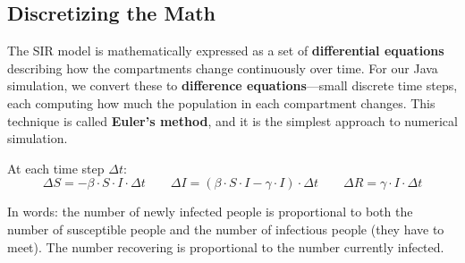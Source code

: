 \documentclass[11pt,letterpaper]{article}
\newcommand{\keyterm}[1]{\textbf{\textcolor{cssecondary}{#1}}}
\begin{document}
\begin{center}
\end{center}

\subsection{Discretizing the Math}

The SIR model is mathematically expressed as a set of \keyterm{differential equations} describing how the compartments change continuously over time. For our Java simulation, we convert these to \keyterm{difference equations}---small discrete time steps, each computing how much the population in each compartment changes. This technique is called \keyterm{Euler's method}, and it is the simplest approach to numerical simulation.

At each time step $\Delta t$:
\[
\Delta S = -\beta \cdot S \cdot I \cdot \Delta t
\qquad
\Delta I = \left(\beta \cdot S \cdot I - \gamma \cdot I\right) \cdot \Delta t
\qquad
\Delta R = \gamma \cdot I \cdot \Delta t
\]

In words: the number of newly infected people is proportional to both the number of susceptible people and the number of infectious people (they have to meet). The number recovering is proportional to the number currently infected.
\end{document}
